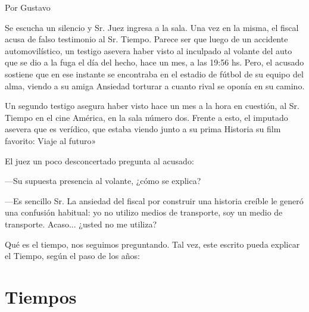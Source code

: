 \documentclass[11pt,twoside,openright,a5paper]{book}
\begin{document}
\begin{flushright}Por Gustavo\end{flushright}

Se escucha un silencio y Sr. Juez ingresa a la sala. Una vez en la misma, el fiscal acusa de falso testimonio al Sr. Tiempo. Parece ser que luego de un accidente automovilístico, un testigo asevera haber visto al inculpado al volante del auto que se dio a la fuga el día del hecho, hace un mes, a las 19:56 hs. Pero, el acusado sostiene que en ese instante se encontraba en el estadio de fútbol de su equipo del alma, viendo a su amiga Ansiedad torturar a cuanto rival se oponía en su camino.

Un segundo testigo asegura haber visto hace un mes a la hora en cuestión, al Sr. Tiempo en el cine América, en la sala número dos. Frente a esto, el imputado asevera que es verídico, que estaba viendo junto a su prima Historia su film favorito: Viaje al futuro»

El juez un poco desconcertado pregunta al acusado: 

---Su supuesta presencia al volante, ¿cómo se explica?

---Es sencillo Sr. La ansiedad del fiscal por construir una historia creíble le generó una confusión habitual: yo no utilizo medios de transporte, soy un medio de transporte. Acaso... ¿usted no me utiliza?

Qué es el tiempo, nos seguimos preguntando. Tal vez, este escrito pueda explicar el Tiempo, según el paso de los años:
\clearpage
\section*{Tiempos}
\end{document}
